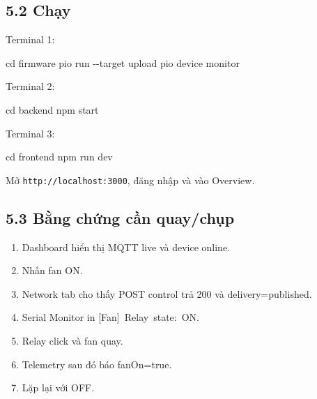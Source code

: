 \documentclass[11pt,oneside,openany]{book}
\renewcommand{\texttt}[1]{{\ttfamily\small #1}}
\newenvironment{Shaded}{\begin{snugshade}}{\end{snugshade}}
\newcommand{\FunctionTok}[1]{\textcolor[rgb]{0.56,0.27,0.68}{#1}}
\newcommand{\NormalTok}[1]{\textcolor[rgb]{0.81,0.81,0.76}{#1}}
\newcommand{\OperatorTok}[1]{\textcolor[rgb]{0.81,0.81,0.76}{#1}}
\renewenvironment{Shaded}{%
  \def\FrameCommand{\fboxsep=8pt\colorbox{shadecolor}}%
  \MakeFramed{\advance\hsize-\width\FrameRestore}%
}{\endMakeFramed}
\providecommand{\tightlist}{\setlength{\itemsep}{1pt}\setlength{\parskip}{0pt}}
\begin{document}
\subsection{5.2 Chạy}\label{52-chux1ea1y}

Terminal 1:

\begin{Shaded}
\begin{Highlighting}[]
\FunctionTok{cd}\NormalTok{ firmware}
\NormalTok{pio run }\OperatorTok{{-}{-}}\NormalTok{target upload}
\NormalTok{pio device monitor}
\end{Highlighting}
\end{Shaded}

Terminal 2:

\begin{Shaded}
\begin{Highlighting}[]
\FunctionTok{cd}\NormalTok{ backend}
\NormalTok{npm }\FunctionTok{start}
\end{Highlighting}
\end{Shaded}

Terminal 3:

\begin{Shaded}
\begin{Highlighting}[]
\FunctionTok{cd}\NormalTok{ frontend}
\NormalTok{npm run dev}
\end{Highlighting}
\end{Shaded}

Mở \nolinkurl{http://localhost:3000}, đăng nhập và vào Overview.

\subsection{5.3 Bằng chứng cần
quay/chụp}\label{53-bux1eb1ng-chux1ee9ng-cux1ea7n-quaychux1ee5p}

\begin{enumerate}
\def\labelenumi{\arabic{enumi}.}
\tightlist
\item
  Dashboard hiển thị MQTT live và device online.
\item
  Nhấn fan ON.
\item
  Network tab cho thấy POST control trả 200 và
  \texttt{delivery=published}.
\item
  Serial Monitor in \texttt{{[}Fan{]}\ Relay\ state:\ ON}.
\item
  Relay click và fan quay.
\item
  Telemetry sau đó báo \texttt{fanOn=true}.
\item
  Lặp lại với OFF.
\end{enumerate}
\end{document}
